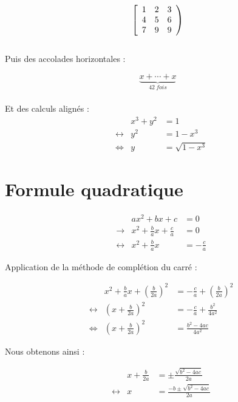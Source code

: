 \documentclass[13pt]{report}
\begin{document}
	$$	
	\left[
		\begin{array}{c c c}
		1 & 2 & 3 \\
		4 & 5 & 6 \\
		7 & 9 & 9
		\end{array}
	\right)
	$$ 
	\\
	Puis des accolades horizontales :
	
	\[
	\underbrace{x+ \cdots + x}_{42 ~\mathit{fois}}
	\]
	\\	
	Et des calculs alignés :
	\begin{align*}
		&& x^3 + y^2 &=1 \\
		&\leftrightarrow& y^2 &= 1-x^3 \\
		&\Leftrightarrow& y &= \sqrt{1-x^3}	
	\end{align*}
	
	
	\clearpage
	
	\section{Formule quadratique}
	
	\begin{align*}
	&&ax^2 + bx + c& = 0 \\
	&\rightarrow &x^2 + \frac{b}{a}x + \frac{c}{a}& = 0 \\
	&\leftrightarrow &x^2 + \frac{b}{a}x& = - \frac{c}{a}
	\end{align*}
	
	Application de la méthode de complétion du carré :
	
	\begin{align*}
	&& x^2 + \frac{b}{a}x + \left(\frac{b}{2a}\right)^2 &= - \frac{c}{a} + \left(\frac{b}{2a}\right)^2 \\
	&\leftrightarrow& \left(x + \frac{b}{2a}\right)^2   &= - \frac{c}{a} + \frac{b^2}{4a^2} \\
	&\Leftrightarrow& \left(x + \frac{b}{2a} \right)^2  &= \frac{b^2 - 4ac}{4a^2}
	\end{align*}
	
	Nous obtenons ainsi :
	
	\begin{align*}
	&&x + \frac{b}{2a}  &= \pm \frac{\sqrt{b^2 - 4ac}}{2a} \\
	&\leftrightarrow& x &= \frac{-b \pm \sqrt{b^2 - 4ac}}{2a}
	\end{align*}

	
	
	
\end{document}
